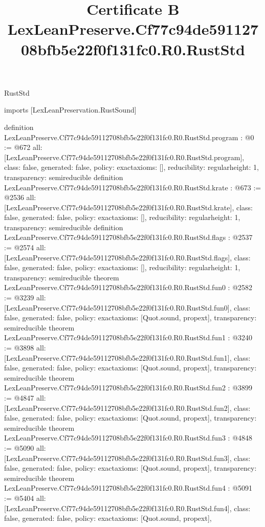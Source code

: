 \begin{lexlean}{RustStd}
\title{Certificate B LexLeanPreserve.Cf77c94de59112708bfb5e22f0f131fc0.R0.RustStd}
\begin{coremodule}
imports [LexLeanPreservation.RustSound]

definition LexLeanPreserve.Cf77c94de59112708bfb5e22f0f131fc0.R0.RustStd.program : @0 := @672 {
  all: [LexLeanPreserve.Cf77c94de59112708bfb5e22f0f131fc0.R0.RustStd.program],
  class: false,
  generated: false,
  policy: exact{axioms: []},
  reducibility: regular{height: 1},
  transparency: semireducible
}
definition LexLeanPreserve.Cf77c94de59112708bfb5e22f0f131fc0.R0.RustStd.krate : @673 := @2536 {
  all: [LexLeanPreserve.Cf77c94de59112708bfb5e22f0f131fc0.R0.RustStd.krate],
  class: false,
  generated: false,
  policy: exact{axioms: []},
  reducibility: regular{height: 1},
  transparency: semireducible
}
definition LexLeanPreserve.Cf77c94de59112708bfb5e22f0f131fc0.R0.RustStd.flags : @2537 := @2574 {
  all: [LexLeanPreserve.Cf77c94de59112708bfb5e22f0f131fc0.R0.RustStd.flags],
  class: false,
  generated: false,
  policy: exact{axioms: []},
  reducibility: regular{height: 1},
  transparency: semireducible
}
theorem LexLeanPreserve.Cf77c94de59112708bfb5e22f0f131fc0.R0.RustStd.fun0 : @2582 := @3239 {
  all: [LexLeanPreserve.Cf77c94de59112708bfb5e22f0f131fc0.R0.RustStd.fun0],
  class: false,
  generated: false,
  policy: exact{axioms: [Quot.sound, propext]},
  transparency: semireducible
}
theorem LexLeanPreserve.Cf77c94de59112708bfb5e22f0f131fc0.R0.RustStd.fun1 : @3240 := @3898 {
  all: [LexLeanPreserve.Cf77c94de59112708bfb5e22f0f131fc0.R0.RustStd.fun1],
  class: false,
  generated: false,
  policy: exact{axioms: [Quot.sound, propext]},
  transparency: semireducible
}
theorem LexLeanPreserve.Cf77c94de59112708bfb5e22f0f131fc0.R0.RustStd.fun2 : @3899 := @4847 {
  all: [LexLeanPreserve.Cf77c94de59112708bfb5e22f0f131fc0.R0.RustStd.fun2],
  class: false,
  generated: false,
  policy: exact{axioms: [Quot.sound, propext]},
  transparency: semireducible
}
theorem LexLeanPreserve.Cf77c94de59112708bfb5e22f0f131fc0.R0.RustStd.fun3 : @4848 := @5090 {
  all: [LexLeanPreserve.Cf77c94de59112708bfb5e22f0f131fc0.R0.RustStd.fun3],
  class: false,
  generated: false,
  policy: exact{axioms: [Quot.sound, propext]},
  transparency: semireducible
}
theorem LexLeanPreserve.Cf77c94de59112708bfb5e22f0f131fc0.R0.RustStd.fun4 : @5091 := @5404 {
  all: [LexLeanPreserve.Cf77c94de59112708bfb5e22f0f131fc0.R0.RustStd.fun4],
  class: false,
  generated: false,
  policy: exact{axioms: [Quot.sound, propext]},
}
\end{coremodule}
\end{lexlean}
